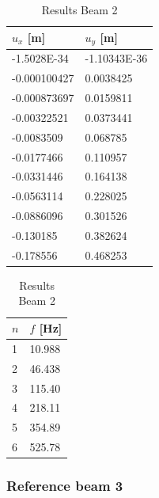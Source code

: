\begin{table}[H]
\begin{tabular}{ll}
\hline
$u_x$ [m] & $u_y$ [m] \\
\hline
-1.5028E-34 & -1.10343E-36 \\
-0.000100427 & 0.0038425 \\
-0.000873697 & 0.0159811 \\
-0.00322521 & 0.0373441 \\
-0.0083509 & 0.068785 \\
-0.0177466 & 0.110957 \\
-0.0331446 & 0.164138 \\
-0.0563114 & 0.228025 \\
-0.0886096 & 0.301526 \\
-0.130185 & 0.382624 \\
-0.178556 & 0.468253\\
\hline
\end{tabular}
\begin{tabular}{ll}
\hline
$n$ & $f$ [Hz] \\
\hline
1 & 10.988 \\
2 & 46.438 \\
3 & 115.40 \\
4 & 218.11 \\
5 & 354.89 \\
6 & 525.78 \\
\hline
\end{tabular}
\caption{Results Beam 2}
\end{table}

\newpage
\subsubsection*{Reference beam 3}


